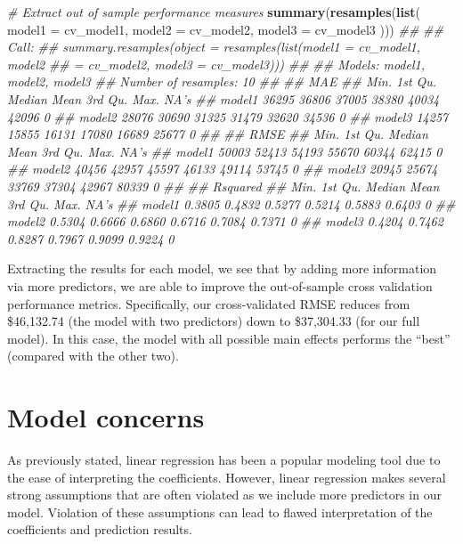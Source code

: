 \documentclass[]{krantz}
\makeatletter
\newenvironment{Shaded}{\begin{snugshade}}{\end{snugshade}}
\newcommand{\CommentTok}[1]{\textcolor[rgb]{0.37,0.37,0.37}{\textit{#1}}}
\newcommand{\DataTypeTok}[1]{\textcolor[rgb]{0.27,0.27,0.27}{#1}}
\newcommand{\KeywordTok}[1]{\textcolor[rgb]{0.27,0.27,0.27}{\textbf{#1}}}
\newcommand{\NormalTok}[1]{#1}
\newenvironment{kframe}{%
\medskip{}
\setlength{\fboxsep}{.8em}
 \def\at@end@of@kframe{}%
 \ifinner\ifhmode%
  \def\at@end@of@kframe{\end{minipage}}%
  \begin{minipage}{\columnwidth}%
 \fi\fi%
 \def\FrameCommand##1{\hskip\@totalleftmargin \hskip-\fboxsep
 \colorbox{shadecolor}{##1}\hskip-\fboxsep
     \hskip-\linewidth \hskip-\@totalleftmargin \hskip\columnwidth}%
 \MakeFramed {\advance\hsize-\width
   \@totalleftmargin\z@ \linewidth\hsize
   \@setminipage}}%
 {\par\unskip\endMakeFramed%
 \at@end@of@kframe}
\renewenvironment{Shaded}{\begin{kframe}}{\end{kframe}}
\makeatother
\begin{document}
\begin{Shaded}
\begin{Highlighting}[]
\CommentTok{# Extract out of sample performance measures}
\KeywordTok{summary}\NormalTok{(}\KeywordTok{resamples}\NormalTok{(}\KeywordTok{list}\NormalTok{(}
  \DataTypeTok{model1 =}\NormalTok{ cv_model1, }
  \DataTypeTok{model2 =}\NormalTok{ cv_model2, }
  \DataTypeTok{model3 =}\NormalTok{ cv_model3}
\NormalTok{)))}
\CommentTok{## }
\CommentTok{## Call:}
\CommentTok{## summary.resamples(object = resamples(list(model1 = cv_model1, model2}
\CommentTok{##  = cv_model2, model3 = cv_model3)))}
\CommentTok{## }
\CommentTok{## Models: model1, model2, model3 }
\CommentTok{## Number of resamples: 10 }
\CommentTok{## }
\CommentTok{## MAE }
\CommentTok{##         Min. 1st Qu. Median  Mean 3rd Qu.  Max. NA's}
\CommentTok{## model1 36295   36806  37005 38380   40034 42096    0}
\CommentTok{## model2 28076   30690  31325 31479   32620 34536    0}
\CommentTok{## model3 14257   15855  16131 17080   16689 25677    0}
\CommentTok{## }
\CommentTok{## RMSE }
\CommentTok{##         Min. 1st Qu. Median  Mean 3rd Qu.  Max. NA's}
\CommentTok{## model1 50003   52413  54193 55670   60344 62415    0}
\CommentTok{## model2 40456   42957  45597 46133   49114 53745    0}
\CommentTok{## model3 20945   25674  33769 37304   42967 80339    0}
\CommentTok{## }
\CommentTok{## Rsquared }
\CommentTok{##          Min. 1st Qu. Median   Mean 3rd Qu.   Max. NA's}
\CommentTok{## model1 0.3805  0.4832 0.5277 0.5214  0.5883 0.6403    0}
\CommentTok{## model2 0.5304  0.6666 0.6860 0.6716  0.7084 0.7371    0}
\CommentTok{## model3 0.4204  0.7462 0.8287 0.7967  0.9099 0.9224    0}
\end{Highlighting}
\end{Shaded}

Extracting the results for each model, we see that by adding more information via more predictors, we are able to improve the out-of-sample cross validation performance metrics. Specifically, our cross-validated RMSE reduces from \$46,132.74 (the model with two predictors) down to \$37,304.33 (for our full model). In this case, the model with all possible main effects performs the ``best'' (compared with the other two).

\hypertarget{lm-residuals}{%
\section{Model concerns}\label{lm-residuals}}

As previously stated, linear regression has been a popular modeling tool due to the ease of interpreting the coefficients. However, linear regression makes several strong assumptions that are often violated as we include more predictors in our model. Violation of these assumptions can lead to flawed interpretation of the coefficients and prediction results.
\end{document}
